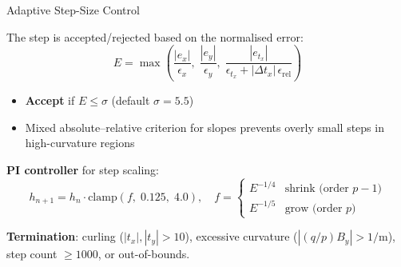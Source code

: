 \documentclass[aspectratio=169, 11pt]{beamer}
\newcommand{\qop}{q/p}
\newcommand{\tx}{t_x}
\newcommand{\ty}{t_y}
\begin{document}
\begin{frame}{Adaptive Step-Size Control}

The step is accepted/rejected based on the normalised error:
\begin{equation*}
  E = \max\!\left(
    \frac{|e_x|}{\epsilon_x},\;
    \frac{|e_y|}{\epsilon_y},\;
    \frac{|e_{\tx}|}{\epsilon_{\tx} + |\Delta\tx|\,\epsilon_\text{rel}}
  \right)
\end{equation*}

\begin{itemize}
  \item \textbf{Accept} if $E \leq \sigma$ (default $\sigma=5.5$)
  \item Mixed absolute--relative criterion for slopes prevents overly small
        steps in high-curvature regions
\end{itemize}

\vspace{4pt}
\textbf{PI controller} for step scaling:
\begin{equation*}
  h_{n+1} = h_n \cdot \text{clamp}\!\left(f,\; 0.125,\; 4.0\right),
  \quad
  f = \begin{cases}
    E^{-1/4}  & \text{shrink (order $p{-}1$)} \\
    E^{-1/5}  & \text{grow (order $p$)}
  \end{cases}
\end{equation*}

\vspace{4pt}
\textbf{Termination}: curling ($|\tx|,|\ty|>10$), excessive curvature
($|(\qop)B_y|>1/\text{m}$), step count $\geq 1000$, or out-of-bounds.
\end{frame}
\end{document}
